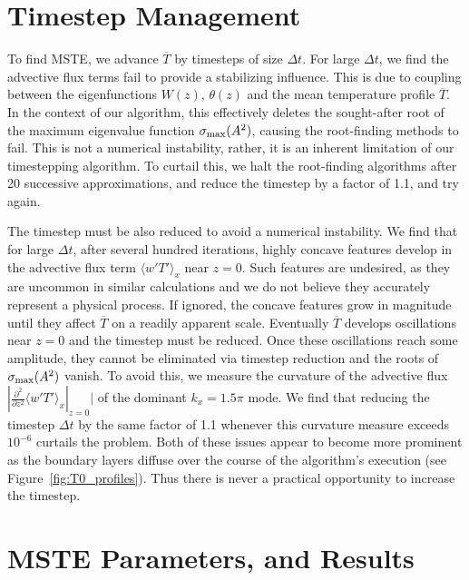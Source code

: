 \documentclass[reprint,amsmath,amssymb,aps,nofootinbib]{revtex4-1}
\newcommand{\eq}[1]{(\ref{#1})}
\begin{document}
\section{Timestep Management} \label{sec:timestep}
To find MSTE, we advance $\overline{T}$ by timesteps of size $\Delta t$.
For large $\Delta t$, we find the advective flux terms fail to provide a stabilizing influence.
This is due to coupling between the eigenfunctions $W(z)$, $\theta(z)$ and the mean temperature profile $\overline{T}$.
In the context of our algorithm, this effectively deletes the sought-after root of the maximum eigenvalue function $\sigma_{\rm{max}}(A^2)$, causing the root-finding methods to fail. 
This is not a numerical instability, rather, it is an inherent limitation of our timestepping algorithm.
To curtail this, we halt the root-finding algorithms after 20 successive approximations, and reduce the timestep by a factor of 1.1, and try again.

The timestep must be also reduced to avoid a numerical instability.
We find that for large $\Delta t$, after several hundred iterations, highly concave features develop in the advective flux term $\langle w'T' \rangle_x$ near $z=0$. 
Such features are undesired, as they are uncommon in similar calculations \cite{Malkus_1954} and we do not believe they accurately represent a physical process.
If ignored, the concave features grow in magnitude until they affect $\overline{T}$ on a readily apparent scale.
Eventually $\overline{T}$ develops oscillations near $z = 0$ and the timestep must be reduced.
Once these oscillations reach some amplitude, they cannot be eliminated via timestep reduction and the roots of $\sigma_{\rm{max}}(A^2)$ vanish.
To avoid this, we measure the curvature of the advective flux $|\frac{\partial^2}{\partial z^2} \langle w'T' \rangle_x|_{z=0}|$ of the dominant $k_x = 1.5\pi$ mode.
We find that reducing the timestep $\Delta t$ by the same factor of 1.1 whenever this curvature measure exceeds $10^{-6}$ curtails the problem.
Both of these issues appear to become more prominent as the boundary layers diffuse over the course of the algorithm's execution (see Figure~\ref{fig:T0_profiles}).
Thus there is never a practical opportunity to increase the timestep.

\onecolumngrid
\section{MSTE Parameters, and Results}\label{sec:tables}
\end{document}
